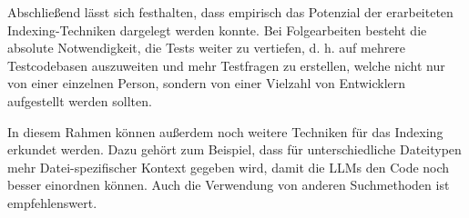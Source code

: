 \documentclass[../main.tex]{subfiles}
\begin{document}
Abschließend lässt sich festhalten, dass empirisch das Potenzial der erarbeiteten Indexing-Techniken dargelegt werden konnte.
Bei Folgearbeiten besteht die absolute Notwendigkeit, die Tests weiter zu vertiefen, d. h. auf mehrere Testcodebasen auszuweiten und mehr Testfragen zu erstellen, welche nicht nur von einer einzelnen Person, sondern von einer Vielzahl von Entwicklern aufgestellt werden sollten.

In diesem Rahmen können außerdem noch weitere Techniken für das Indexing erkundet werden.
Dazu gehört zum Beispiel, dass für unterschiedliche Dateitypen mehr Datei-spezifischer Kontext gegeben wird, damit die \glspl{LLM} den Code noch besser einordnen können. Auch die Verwendung von anderen Suchmethoden ist empfehlenswert.
\end{document}
